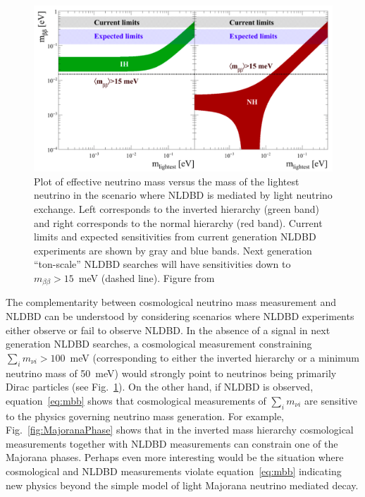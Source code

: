 \begin{figure}[h!]
\centering \includegraphics[width=1.0\textwidth]{Neutrinos/NLDBD_sensitivity.png}
\caption{Plot of effective neutrino mass versus the mass of the lightest neutrino in the scenario where NLDBD is mediated by light neutrino exchange. Left corresponds to the inverted hierarchy (green band) and right corresponds to the normal hierarchy (red band). Current limits and expected sensitivities from current generation NLDBD experiments are shown by gray and blue bands. Next generation ``ton-scale'' NLDBD searches will have sensitivities down to $m_{\beta\beta}>15$~meV (dashed line). Figure from~\cite{NSAC}}
\label{fig:NLDBD}
\end{figure}

The complementarity between cosmological neutrino mass measurement and NLDBD can be understood by considering scenarios where NLDBD experiments either observe or fail to observe NLDBD. In the absence of a signal in next generation NLDBD searches, a cosmological measurement constraining $\sum_i m_{\nu i} > 100$~meV (corresponding to either the inverted hierarchy or a minimum neutrino mass of 50~meV) would strongly point to neutrinos being primarily Dirac particles (see Fig.~\ref{fig:NLDBD}). On the other hand, if NLDBD is observed, equation~\ref{eq:mbb} shows that cosmological measurements of $\sum_i m_{\nu i}$ are sensitive to the physics governing neutrino mass generation. For example, Fig.~\ref{fig:MajoranaPhase} shows that in the inverted mass hierarchy cosmological measurements together with NLDBD measurements can constrain one of the Majorana phases. Perhaps even more interesting would be the situation where cosmological and NLDBD measurements violate equation~\ref{eq:mbb} indicating new physics beyond the simple model of light Majorana neutrino mediated decay.

